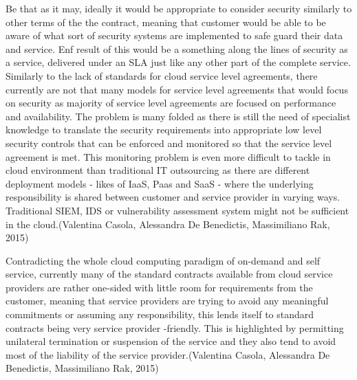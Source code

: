 \documentclass{article}
\begin{document}
Be that as it may, ideally it would be appropriate to consider security similarly to other terms of the the contract, meaning that customer would be able to be aware of what sort of security systems are implemented to safe guard their data and service. Enf result of this would be a something along the lines of security as a service, delivered under an SLA just like any other part of the complete service. Similarly to the lack of standards for cloud service level agreements, there currently are not that many models for service level agreements that would focus on security as majority of service level agreements are focused on performance and availability. The problem is many folded as there is still the need of specialist knowledge to translate the security requirements into appropriate low level security controls that can be enforced and monitored so that the service level agreement is met. This monitoring problem is even more difficult to tackle in cloud environment than traditional IT outsourcing as there are different deployment models - likes of IaaS, Paas and SaaS - where the underlying responsibility is shared between customer and service provider in varying ways. Traditional SIEM, IDS or vulnerability assessment system might not be sufficient in the cloud.(Valentina Casola, Alessandra De Benedictis, Massimiliano Rak, 2015)
\par
Contradicting the whole cloud computing paradigm of on-demand and self service, currently many of the standard contracts available from cloud service providers are rather one-sided with little room for requirements from the customer, meaning that service providers are trying to avoid any meaningful commitments or assuming any responsibility, this lends itself to standard contracts being very service provider -friendly. This is highlighted by permitting unilateral termination or suspension of the service and they also tend to avoid most of the liability of the service provider.(Valentina Casola, Alessandra De Benedictis, Massimiliano Rak, 2015)
\end{document}
